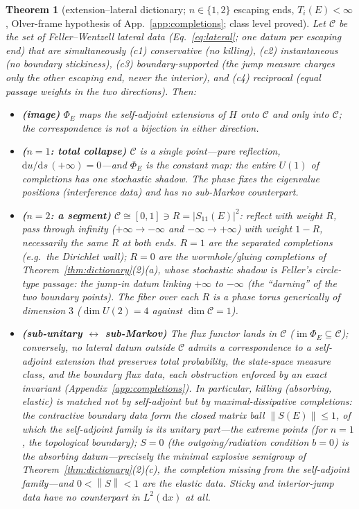 \documentclass[11pt]{article}
\newtheorem{theorem}{Theorem}[section]
\theoremstyle{definition}
\theoremstyle{remark}
\newcommand{\dd}{\mathrm{d}}
\newcommand{\norm}[1]{\left\lVert #1 \right\rVert}
\begin{document}
\begin{theorem}[extension--lateral dictionary; $n\in\{1,2\}$ escaping
ends, $T_{i}(E)<\infty$, Olver-frame hypothesis of
App.~\ref{app:completions}; class level proved]
\label{thm:extlat}
Let $\mathcal C$ be the set of Feller--Wentzell lateral data
(Eq.~\eqref{eq:lateral}; one datum per escaping end) that are
simultaneously \emph{(c1) conservative} (no killing),
\emph{(c2) instantaneous} (no boundary stickiness),
\emph{(c3) boundary-supported} (the jump measure charges only the other
escaping end, never the interior), and \emph{(c4) reciprocal} (equal
passage weights in the two directions). Then:
\begin{itemize}
\item[(1)] \textbf{(image)} $\Phi_{E}$ maps the self-adjoint extensions
of $H$ \emph{onto} $\mathcal C$ and \emph{only into} $\mathcal C$; the
correspondence is not a bijection in either direction.
\item[(2)] \textbf{($n=1$: total collapse)} $\mathcal C$ is a single
point---pure reflection, $\dd u/\dd s\,(+\infty)=0$---and $\Phi_{E}$ is
the \emph{constant} map: the entire $U(1)$ of completions has one
stochastic shadow. The phase fixes the eigenvalue positions
(interference data) and has no sub-Markov counterpart.
\item[(3)] \textbf{($n=2$: a segment)} $\mathcal C\cong[0,1]\ni
R=|S_{11}(E)|^{2}$: reflect with weight $R$, pass through infinity
($+\infty\to-\infty$ and $-\infty\to+\infty$) with weight $1-R$,
necessarily the \emph{same} $R$ at both ends. $R=1$ are the separated
completions (e.g.\ the Dirichlet wall); $R=0$ are the wormhole/gluing
completions of Theorem~\ref{thm:dictionary}(2)(a), whose stochastic
shadow is Feller's circle-type passage: the jump-in datum linking
$+\infty$ to $-\infty$ (the ``darning'' of the two boundary points).
The fiber over each $R$ is a phase torus generically of dimension $3$
($\dim U(2)=4$ against $\dim\mathcal C=1$).
\item[(4)] \textbf{(sub-unitary $\leftrightarrow$ sub-Markov)} The flux
functor lands in $\mathcal C$ ($\operatorname{im}\Phi_{E}\subseteq\mathcal C$);
conversely, no lateral datum \emph{outside} $\mathcal C$ admits a
correspondence to a self-adjoint extension that preserves total probability,
the state-space measure class, and the boundary flux data, each obstruction
enforced by an exact invariant (Appendix~\ref{app:completions}). In particular, killing
(absorbing, elastic) is matched not by self-adjoint but by
\emph{maximal-dissipative} completions: the contractive boundary data
form the closed matrix ball $\norm{S(E)}\le1$, of which the self-adjoint
family is its unitary part---the extreme points (for $n=1$, the topological
boundary); $S=0$ (the outgoing/radiation condition
$b=0$) is the absorbing datum---precisely the minimal explosive
semigroup of Theorem~\ref{thm:dictionary}(2)(c), the completion
\emph{missing} from the self-adjoint family---and $0<\norm{S}<1$ are the
elastic data. Sticky and interior-jump data have no counterpart in
$L^{2}(\dd x)$ at all.
\end{itemize}
\end{theorem}
\end{document}
